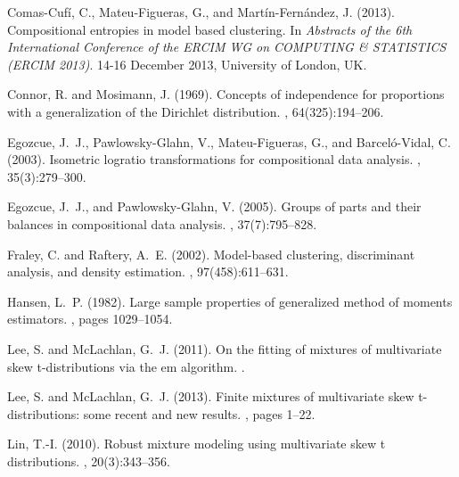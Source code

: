 \documentclass[10pt, a4paper]{article}
\begin{document}
\begin{thebibliography}{00}
Comas-Cuf\'i, C., Mateu-Figueras, G., and Mart\'in-Fern\'andez, J. (2013).
\newblock Compositional entropies in model based clustering.
\newblock In {\em Abstracts of the 6th International Conference of the ERCIM WG
  on COMPUTING \& STATISTICS (ERCIM 2013)}. 14-16 December 2013, University of
  London, UK.

Connor, R. and Mosimann, J. (1969).
\newblock Concepts of independence for proportions with a generalization of the
  {D}irichlet distribution.
,
  64(325):194--206.

Egozcue, J.~J., Pawlowsky-Glahn, V., Mateu-Figueras, G., and Barcel{\'o}-Vidal,
  C. (2003).
\newblock Isometric logratio transformations for compositional data analysis.
, 35(3):279--300.

Egozcue, J.~J., and Pawlowsky-Glahn, V. (2005).
\newblock Groups of parts and their balances in compositional data analysis.
, 37(7):795--828.

Fraley, C. and Raftery, A.~E. (2002).
\newblock Model-based clustering, discriminant analysis, and density
  estimation.
,
  97(458):611--631.

Hansen, L.~P. (1982).
\newblock Large sample properties of generalized method of moments estimators.
, pages
  1029--1054.

Lee, S. and McLachlan, G.~J. (2011).
\newblock On the fitting of mixtures of multivariate skew t-distributions via
  the em algorithm.
.

Lee, S. and McLachlan, G.~J. (2013).
\newblock Finite mixtures of multivariate skew t-distributions: some recent and
  new results.
, pages 1--22.

Lin, T.-I. (2010).
\newblock Robust mixture modeling using multivariate skew t distributions.
, 20(3):343--356.


\end{thebibliography}
\end{document}
